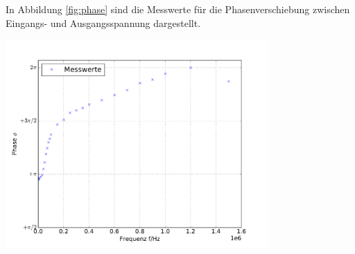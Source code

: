 \documentclass[]{scrartcl}
\begin{document}
In Abbildung \ref{fig:phase} sind die Messwerte für die Phasenverschiebung zwischen Eingangs- und Ausgangsspannung dargestellt.
\begin{center}
	\includegraphics[width=10cm]{images/phase_frequenz.pdf}
	\label{fig:phase}
\end{center}
\end{document}
